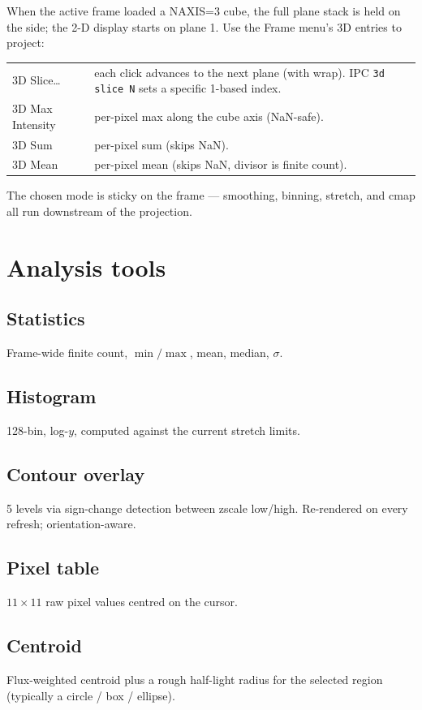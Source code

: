 \documentclass[11pt,a4paper]{article}
\begin{document}
When the active frame loaded a NAXIS=3 cube, the full plane stack is held
on the side; the 2-D display starts on plane 1. Use the \textsf{Frame}
menu's 3D entries to project:

\begin{tabular}{@{}>{\sffamily}lp{}@{}}
\toprule
3D Slice\dots      & each click advances to the next plane (with wrap).
                     IPC \texttt{3d slice N} sets a specific 1-based index. \\
3D Max Intensity   & per-pixel max along the cube axis (NaN-safe). \\
3D Sum             & per-pixel sum (skips NaN). \\
3D Mean            & per-pixel mean (skips NaN, divisor is finite count). \\
\bottomrule
\end{tabular}

The chosen mode is sticky on the frame --- smoothing, binning, stretch,
and cmap all run downstream of the projection.

\section{Analysis tools}

\subsection{Statistics}
Frame-wide finite count, $\min / \max$, mean, median, $\sigma$.

\subsection{Histogram}
128-bin, log-$y$, computed against the current stretch limits.

\subsection{Contour overlay}
5 levels via sign-change detection between zscale low/high. Re-rendered
on every refresh; orientation-aware.

\subsection{Pixel table}
$11 \times 11$ raw pixel values centred on the cursor.

\subsection{Centroid}
Flux-weighted centroid plus a rough half-light radius for the selected
region (typically a circle / box / ellipse).
\end{document}
